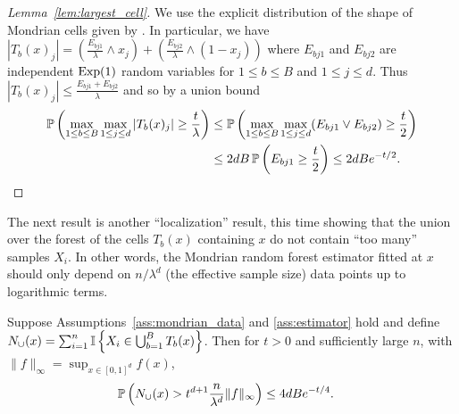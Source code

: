 \begin{proof}[Lemma~\ref{lem:largest_cell}]
  We use the explicit distribution of the shape of Mondrian cells
  given by \citet[Proposition~1]{mourtada2020minimax}.
  In particular, we have
  $|T_b(x)_j| = \left( \frac{E_{bj1}}{\lambda} \wedge x_j \right)
  + \left( \frac{E_{bj2}}{\lambda} \wedge (1-x_j) \right)$
  where $E_{bj1}$ and $E_{bj2}$
  are independent $\Exp(1)$ random variables for
  $1 \leq b \leq B$ and $1 \leq j \leq d$.
  Thus $|T_b(x)_j| \leq \frac{E_{bj1} + E_{bj2}}{\lambda}$
  and so by a union bound
  \begin{align*}
    \P \left(
      \max_{1 \leq b \leq B}
      \max_{1 \leq j \leq d}
      |T_b(x)_j|
      \geq \frac{t}{\lambda}
    \right)
    &\leq
    \P \left(
      \max_{1 \leq b \leq B}
      \max_{1 \leq j \leq d}
      (E_{bj1} \vee E_{bj2})
      \geq \frac{t}{2}
    \right) \\
    &\leq
    2dB\,
    \P \left(
      E_{bj1}
      \geq \frac{t}{2}
    \right)
    \leq
    2dB e^{-t/2}.
  \end{align*}
\end{proof}

The next result is another ``localization'' result, this time
showing that the union over the forest
of the cells $T_b(x)$ containing $x$ do not contain ``too many''
samples $X_i$.
In other words, the Mondrian random forest estimator fitted at $x$
should only depend on $n/\lambda^d$ (the effective sample size)
data points up to logarithmic terms.

\begin{lemma}%
  \label{lem:active_data}
  Suppose Assumptions~\ref{ass:mondrian_data} and \ref{ass:estimator} hold
  and define
  $N_{\cup}(x) =
  \sum_{i=1}^{n} \I \left\{ X_i \in \bigcup_{b=1}^{B} T_b(x) \right\}$.
  Then for $t > 0$ and sufficiently large $n$,
  with $\|f\|_\infty = \sup_{x \in [0,1]^d} f(x)$,
  \begin{align*}
    \P \left( N_{\cup}(x) > t^{d+1}
      \frac{n}{\lambda^d}
      \|f\|_\infty
    \right)
    &\leq
    4 d B e^{-t/4}.
  \end{align*}
\end{lemma}

